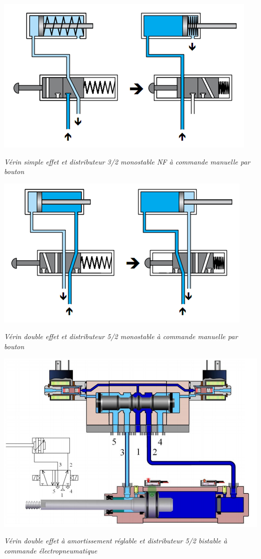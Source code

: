 \documentclass[10pt]{article}
\begin{document}
\begin{minipage}[c]{.47\textwidth}
\begin{center}
\includegraphics[width=.9\textwidth]{images/Fig_07}

\textit{Vérin simple effet et distributeur 3/2 monostable NF à commande manuelle par bouton}
\end{center}
\end{minipage} \hfill
\begin{minipage}[c]{.47\textwidth}
\begin{center}
\includegraphics[width=.9\textwidth]{images/Fig_08}

\textit{Vérin double effet et distributeur 5/2 monostable à commande manuelle par bouton}
\end{center}
\end{minipage}


\begin{center}
\includegraphics[width=.9\textwidth]{images/Fig_09}

\textit{Vérin double effet à amortissement réglable et distributeur 5/2 bistable à commande électropneumatique}
\end{center}
\end{document}
